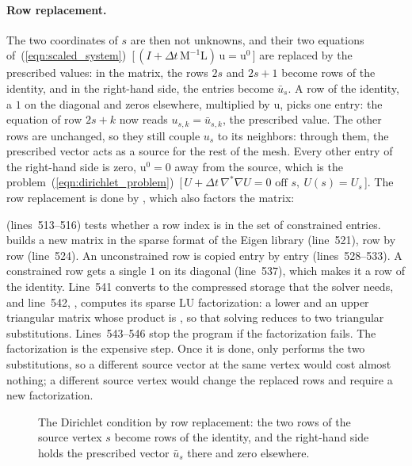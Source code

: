 \paragraph{Row replacement.} The two coordinates of $s$ are then not unknowns, and their two equations of~(\ref{eqn:scaled_system})~[\,$(I + \Delta t\,\mathrm M^{-1}\mathrm L)\,\mathrm u = \mathrm u^0$\,] are replaced by the prescribed values: in the matrix, the rows $2s$ and $2s + 1$ become rows of the identity, and in the right-hand side, the entries become $\bar u_s$. A row of the identity, a $1$ on the diagonal and zeros elsewhere, multiplied by $\mathrm u$, picks one entry: the equation of row $2s + k$ now reads $u_{s,k} = \bar u_{s,k}$, the prescribed value. The other rows are unchanged, so they still couple $u_s$ to its neighbors: through them, the prescribed vector acts as a source for the rest of the mesh. Every other entry of the right-hand side is zero, $\mathrm u^0 = 0$ away from the source, which is the problem~(\ref{eqn:dirichlet_problem})~[\,$U + \Delta t\,\nabla^*\nabla U = 0 \text{ off } s,\ U(s) = U_s$\,]. The row replacement is done by , which also factors the matrix:

 (lines~513--516) tests whether a row index is in the set of constrained entries.  builds a new matrix  in the sparse format of the Eigen library (line~521), row by row (line~524). An unconstrained row is copied entry by entry (lines~528--533). A constrained row gets a single $1$ on its diagonal (line~537), which makes it a row of the identity. Line~541 converts  to the compressed storage that the solver needs, and line~542, , computes its sparse LU factorization: a lower and an upper triangular matrix whose product is , so that solving reduces to two triangular substitutions. Lines~543--546 stop the program if the factorization fails. The factorization is the expensive step. Once it is done,  only performs the two substitutions, so a different source vector at the same vertex would cost almost nothing; a different source vertex would change the replaced rows and require a new factorization.
\begin{figure}[t]
\centering
{}
\caption{The Dirichlet condition by row replacement: the two rows of the source vertex $s$ become rows of the identity, and the right-hand side holds the prescribed vector $\bar u_s$ there and zero elsewhere.}
\label{fig:dirichlet}
\end{figure}

